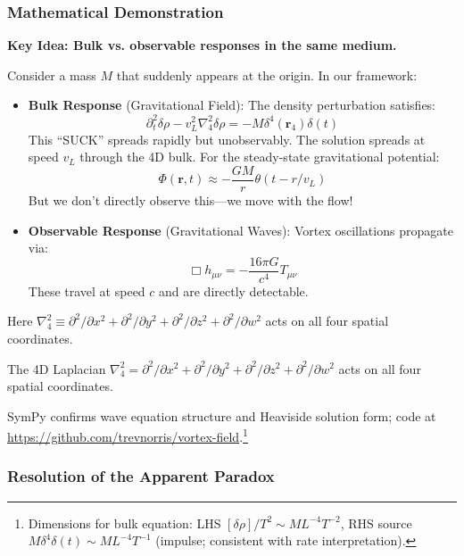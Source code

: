 \subsubsection{Mathematical Demonstration}

\textbf{Key Idea: Bulk vs. observable responses in the same medium.}

Consider a mass $M$ that suddenly appears at the origin. In our framework:

\begin{itemize}
\item \textbf{Bulk Response} (Gravitational Field): The density perturbation satisfies:
\begin{equation}
\partial_t^2 \delta\rho - v_L^2 \nabla_4^2 \delta\rho = -M\delta^4(\mathbf{r}_4)\delta(t)
\end{equation}
This ``SUCK'' spreads rapidly but unobservably. The solution spreads at speed $v_L$ through the 4D bulk. For the steady-state gravitational potential:
\begin{equation}
\Phi(\mathbf{r},t) \approx -\frac{GM}{r} \theta(t - r/v_L)
\end{equation}
But we don't directly observe this---we move with the flow!

\item \textbf{Observable Response} (Gravitational Waves): Vortex oscillations propagate via:
\begin{equation}
\Box h_{\mu\nu} = -\frac{16\pi G}{c^4} T_{\mu\nu}
\end{equation}
These travel at speed $c$ and are directly detectable.
\end{itemize}

Here $\nabla_4^2 \equiv \partial^2/\partial x^2 + \partial^2/\partial y^2 + \partial^2/\partial z^2 + \partial^2/\partial w^2$ acts on all four spatial coordinates.

The 4D Laplacian $\nabla_4^2 = \partial^2/\partial x^2 + \partial^2/\partial y^2 + \partial^2/\partial z^2 + \partial^2/\partial w^2$ acts on all four spatial coordinates.

SymPy confirms wave equation structure and Heaviside solution form; code at \url{https://github.com/trevnorris/vortex-field}.\footnote{Dimensions for bulk equation: LHS $[\delta\rho] / T^2 \sim M L^{-4} T^{-2}$, RHS source $M \delta^4 \delta(t) \sim M L^{-4} T^{-1}$ (impulse; consistent with rate interpretation).}

\subsubsection{Resolution of the Apparent Paradox}

